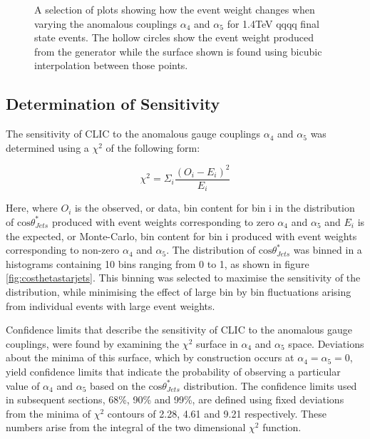 \begin{figure}
\caption[Event weights from Whizard for 1.4TeV \nu{\nu}qqqq final state events with interpolated surface.]{A selection of plots showing how the event weight changes when varying the anomalous couplings $\alpha_{4}$ and $\alpha_{5}$ for 1.4TeV \nu{\nu}qqqq final state events.  The hollow circles show the event weight produced from the generator while the surface shown is found using bicubic interpolation between those points.}
\label{fig:eventweights1400interpolated}
\end{figure}

\subsection{Determination of Sensitivity}
The sensitivity of CLIC to the anomalous gauge couplings $\alpha_{4}$ and $\alpha_{5}$ was determined using a $\chi^{2}$ of the following form:

\begin{equation}
\chi^{2} = \Sigma_{i} \frac{(O_{i} - E_{i})^{2}}{E_{i}}
\end{equation}

Here, where $O_{i}$ is the observed, or data, bin content for bin i in the distribution of $\text{cos}\theta^{*}_{Jets}$ produced with event weights corresponding to zero $\alpha_{4}$ and $\alpha_{5}$ and $E_{i}$ is the expected, or Monte-Carlo, bin content for bin i produced with event weights corresponding to non-zero $\alpha_{4}$ and $\alpha_{5}$.  The distribution of $\text{cos}\theta^{*}_{Jets}$ was binned in a histograms containing 10 bins ranging from 0 to 1, as shown in figure \ref{fig:costhetastarjets}.  This binning was selected to maximise the sensitivity of the distribution, while minimising the effect of large bin by bin fluctuations arising from individual events with large event weights.

Confidence limits that describe the sensitivity of CLIC to the anomalous gauge couplings, were found by examining the $\chi^{2}$ surface in $\alpha_{4}$ and $\alpha_{5}$ space.  Deviations about the minima of this surface, which by construction occurs at $\alpha_{4} = \alpha_{5} = 0$, yield confidence limits that indicate the probability of observing a particular value of $\alpha_{4}$ and $\alpha_{5}$ based on the $\text{cos}\theta^{*}_{Jets}$ distribution.  The confidence limits used in subsequent sections, 68\%, 90\% and 99\%, are defined using fixed deviations from the minima of $\chi^{2}$ contours of 2.28, 4.61 and 9.21 respectively.  These numbers arise from the integral of the two dimensional $\chi^{2}$ function.

